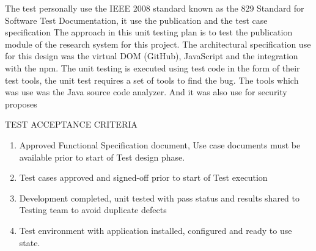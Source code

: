 The test personally use the IEEE 2008 standard known as the 829 Standard for Software Test Documentation, it use the publication and the test case specification The approach in this unit testing plan is to test the publication module of the research system for this project. The architectural specification use for this design was the virtual DOM (GitHub), JavaScript and the integration with the npm.
The unit testing is executed using test code in the form of their test tools, the unit test requires a set of tools to find the bug. The tools which was use was the Java source code analyzer. And it was also use for security proposes

TEST ACCEPTANCE CRITERIA
\begin{enumerate}
	\item Approved Functional Specification document, Use case documents must be available prior to start of Test design phase.
	\item Test cases approved and signed-off prior to start of Test execution
	\item Development completed, unit tested with pass status and results shared to Testing team to avoid duplicate defects
	\item Test environment with application installed, configured and ready to use state.
\end{enumerate}